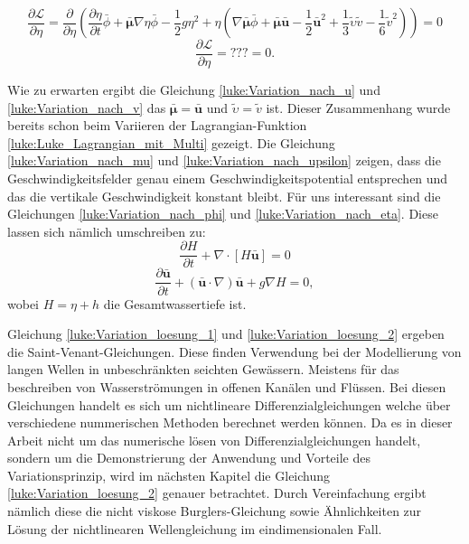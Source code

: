 \[
\frac{\partial \mathscr{L}}{\partial \eta}
=
\frac{\partial \mathscr{}}{\partial \eta}
\left(
\frac{\partial \eta}{\partial t} \bar{\phi}
+
\bar{\bm{\mu}}\nabla\eta\bar{\phi}
-
\frac{1}{2} g \eta^2
+
\eta \left(\nabla \bar{\bm{\mu}}\bar{\phi} + \bar{\bm{\mu}}\bar{\bm{u}} - \frac{1}{2} \bar{\bm{u}}^2 + \frac{1}{3} \tilde{\upsilon}\tilde{v} - \frac{1}{6}\tilde{v}^2\right)
\right)
= 0
\]
\begin{equation}
	\frac{\partial \mathscr{L}}{\partial \eta}
	=
	???
	= 0.
	\label{luke:Variation_nach_eta}
\end{equation}

Wie zu erwarten ergibt die Gleichung \eqref{luke:Variation_nach_u} und \eqref{luke:Variation_nach_v} das $\bar{\bm{\mu}} = \bar{\bm{u}}$ und $\tilde{\upsilon} = \tilde{v}$ ist.
Dieser Zusammenhang wurde bereits schon beim Variieren der Lagrangian-Funktion \eqref{luke:Luke_Lagrangian_mit_Multi} gezeigt.
Die Gleichung \eqref{luke:Variation_nach_mu} und \eqref{luke:Variation_nach_upsilon} zeigen, dass die Geschwindigkeitsfelder genau einem Geschwindigkeitspotential entsprechen und das die vertikale Geschwindigkeit konstant bleibt. 
Für uns interessant sind die Gleichungen \eqref{luke:Variation_nach_phi} und \eqref{luke:Variation_nach_eta}.
Diese lassen sich nämlich umschreiben zu: 
\begin{equation}
	\frac{\partial H}{\partial t} + \nabla \cdot [H \bar{\bm{u}}] = 0
	\label{luke:Variation_loesung_1}
\end{equation}
\begin{equation}
	\frac{\partial \bar{\bm{u}}}{\partial t} + (\bar{\bm{u}} \cdot \nabla) \bar{\bm{u}} + g \nabla H = 0,
	\label{luke:Variation_loesung_2}
\end{equation}
wobei $H = \eta + h$ die Gesamtwassertiefe ist.

Gleichung \eqref{luke:Variation_loesung_1} und \eqref{luke:Variation_loesung_2} ergeben die Saint-Venant-Gleichungen.
Diese finden Verwendung bei der Modellierung von langen Wellen in unbeschränkten seichten Gewässern.
Meistens für das beschreiben von Wasserströmungen in offenen Kanälen und Flüssen.
Bei diesen Gleichungen handelt es sich um nichtlineare Differenzialgleichungen welche über verschiedene nummerischen Methoden berechnet werden können.
Da es in dieser Arbeit nicht um das numerische lösen von Differenzialgleichungen handelt, sondern um die Demonstrierung der Anwendung und Vorteile des Variationsprinzip, wird im nächsten Kapitel die Gleichung \eqref{luke:Variation_loesung_2} genauer betrachtet.
Durch Vereinfachung ergibt nämlich diese die nicht viskose Burglers-Gleichung sowie Ähnlichkeiten zur Lösung der nichtlinearen Wellengleichung im eindimensionalen Fall.

